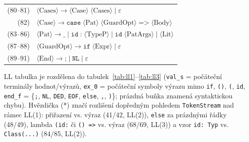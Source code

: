 \documentclass[11pt, a4paper]{article}
\begin{document}
\begin{tabular}{@{}r l@{}}
  (80--81)& $\langle\text{Cases}\rangle \to \langle\text{Case}\rangle\;\langle\text{Cases}\rangle \mid \varepsilon$ \\
  (82)    & $\langle\text{Case}\rangle \to \texttt{case}\;\langle\text{Pat}\rangle\;\langle\text{GuardOpt}\rangle\;\texttt{=>}\;\langle\text{Body}\rangle$ \\
  (83--86)& $\langle\text{Pat}\rangle \to \texttt{\_} \mid \texttt{id}\;\texttt{:}\;\langle\text{TypeP}\rangle \mid \texttt{id}\;\langle\text{PatArgs}\rangle \mid \langle\text{Lit}\rangle$ \\
  (87--88)& $\langle\text{GuardOpt}\rangle \to \texttt{if}\;\langle\text{Expr}\rangle \mid \varepsilon$ \\
  (89--91)& $\langle\text{End}\rangle \to \texttt{;} \mid \texttt{NL} \mid \varepsilon$ \\
\end{tabular}
\endgroup

\newpage
LL tabulka je rozdělena do tabulek~\ref{tab:ll1}--\ref{tab:ll3} (\texttt{val\_s} = počáteční terminály hodnot/výrazů, \texttt{ex\_0} = počáteční symboly výrazu mimo \texttt{if}, \texttt{()}, \texttt{(}, \texttt{id}, \texttt{end\_f} = \{\texttt{;}, \texttt{NL}, \texttt{DED}, \texttt{EOF}, \texttt{else}, \texttt{,}, \texttt{)}\}; prázdná buňka znamená syntaktickou chybu). Hvězdička (*) značí rozlišení dopředným pohledem \texttt{TokenStream} nad rámec LL(1): přiřazení vs. výraz (41/42, LL(2)), \texttt{else} za prázdnými řádky (48/49), lambda \texttt{(id:} či \texttt{() =>} vs. výraz (68/69, LL(3)) a vzor \texttt{id: Typ} vs. \texttt{Class(...)} (84/85, LL(2)).
\end{document}
